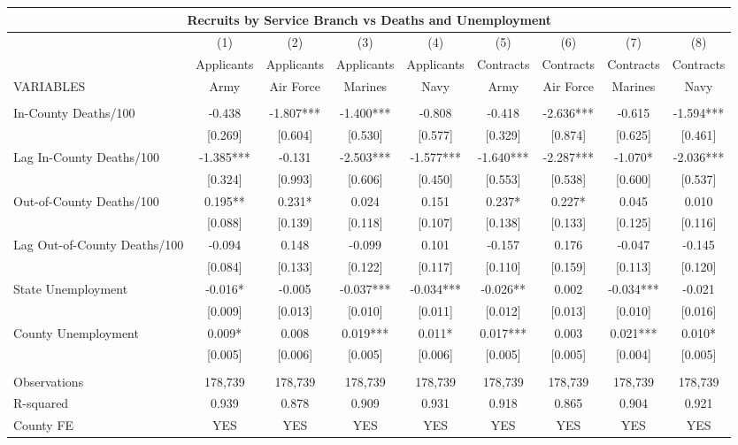 \documentclass[]{article}
\begin{document}
\begin{tabular}{lcccccccc}
\multicolumn{9}{c}{Recruits by Service Branch vs Deaths and Unemployment} \\ \hline
 & (1) & (2) & (3) & (4) & (5) & (6) & (7) & (8) \\
 & Applicants & Applicants & Applicants & Applicants & Contracts & Contracts & Contracts & Contracts \\
VARIABLES & Army & Air Force & Marines & Navy & Army & Air Force & Marines & Navy \\ \hline
 &  &  &  &  &  &  &  &  \\
In-County Deaths/100 & -0.438 & -1.807*** & -1.400*** & -0.808 & -0.418 & -2.636*** & -0.615 & -1.594*** \\
 & [0.269] & [0.604] & [0.530] & [0.577] & [0.329] & [0.874] & [0.625] & [0.461] \\
Lag In-County Deaths/100 & -1.385*** & -0.131 & -2.503*** & -1.577*** & -1.640*** & -2.287*** & -1.070* & -2.036*** \\
 & [0.324] & [0.993] & [0.606] & [0.450] & [0.553] & [0.538] & [0.600] & [0.537] \\
Out-of-County Deaths/100 & 0.195** & 0.231* & 0.024 & 0.151 & 0.237* & 0.227* & 0.045 & 0.010 \\
 & [0.088] & [0.139] & [0.118] & [0.107] & [0.138] & [0.133] & [0.125] & [0.116] \\
Lag Out-of-County Deaths/100 & -0.094 & 0.148 & -0.099 & 0.101 & -0.157 & 0.176 & -0.047 & -0.145 \\
 & [0.084] & [0.133] & [0.122] & [0.117] & [0.110] & [0.159] & [0.113] & [0.120] \\
State Unemployment & -0.016* & -0.005 & -0.037*** & -0.034*** & -0.026** & 0.002 & -0.034*** & -0.021 \\
 & [0.009] & [0.013] & [0.010] & [0.011] & [0.012] & [0.013] & [0.010] & [0.016] \\
County Unemployment & 0.009* & 0.008 & 0.019*** & 0.011* & 0.017*** & 0.003 & 0.021*** & 0.010* \\
 & [0.005] & [0.006] & [0.005] & [0.006] & [0.005] & [0.005] & [0.004] & [0.005] \\
 &  &  &  &  &  &  &  &  \\
Observations & 178,739 & 178,739 & 178,739 & 178,739 & 178,739 & 178,739 & 178,739 & 178,739 \\
R-squared & 0.939 & 0.878 & 0.909 & 0.931 & 0.918 & 0.865 & 0.904 & 0.921 \\
County FE & YES & YES & YES & YES & YES & YES & YES & YES \\

\end{tabular}
\end{document}

